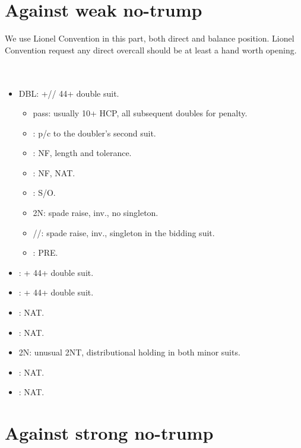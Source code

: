 \documentclass[12pt,twoside,a5paper]{report}%
\begin{document}
	\section*{Against weak no-trump}
		We use Lionel Convention in this part, both direct and balance position. Lionel Convention request any direct overcall should be at least a hand worth opening.\\
		\\
		\\
		\begin{itemize}
		\renewcommand{\labelitemi}{--}
			\item DBL: \sp{}+\he{}/\di{}/\cl{} 44+ double suit.
				\begin{itemize}
				\renewcommand{\labelitemi}{--}
					\item pass: usually 10+ HCP, all subsequent doubles for penalty.
					\item {}: p/c to the doubler's second suit.
					\item {}: NF, \di{} length and \he{} tolerance.
					\item {}: NF, NAT.
					\item {}: S/O.
					\item 2N: spade raise, inv., no singleton.
					\item {}/\di{}/\he{}: spade raise, inv., singleton in the bidding suit.
					\item {}: PRE.
				\end{itemize}
			\item {}: \he{}+\cl{} 44+ double suit.
			\item {}: \he{}+\di{} 44+ double suit.
			\item {}: NAT.
			\item {}: NAT.
			\item 2N: unusual 2NT, distributional holding in both minor suits.
			\item {}: NAT.
			\item {}: NAT.
		\end{itemize}
		
	\section*{Against strong no-trump}
\end{document}
